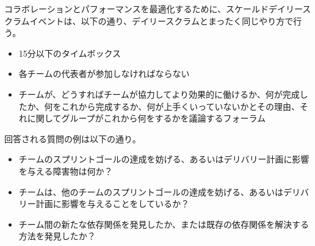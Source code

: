 \documentclass[12pt,a4paper,parskip=full]{scrartcl}
\begin{document}

コラボレーションとパフォーマンスを最適化するために、スケールドデイリースクラムイベントは、以下の通り、デイリースクラムとまったく同じやり方で行う。


\begin{itemize}
\itemsep1pt\parskip0pt

\item
15分以下のタイムボックス
\item
各チームの代表者が参加しなければならない
\item
チームが、どうすればチームが協力してより効果的に働けるか、何が完成したか、何をこれから完成するか、何が上手くいっていないかとその理由、それに関してグループがこれから何をするかを議論するフォーラム
\end{itemize}

回答される質問の例は以下の通り。

\begin{itemize}
\itemsep1pt\parskip0pt

\item
チームのスプリントゴールの達成を妨げる、あるいはデリバリー計画に影響を与える障害物は何か？
\item
チームは、他のチームのスプリントゴールの達成を妨げる、あるいはデリバリー計画に影響を与えることをしているか？
\item
チーム間の新たな依存関係を発見したか、または既存の依存関係を解決する方法を発見したか？
\end{itemize}

\iffalse
\end{document}
